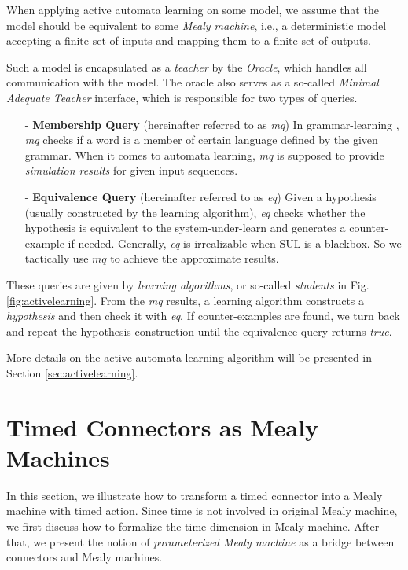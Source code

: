 \documentclass[conference, a4paper]{IEEEtran}
\begin{document}
When applying active automata learning on some model, we assume that the model should be equivalent
to some \emph{Mealy machine}, i.e., a deterministic model accepting a finite set of inputs and
mapping them to a finite set of outputs.

Such a model is encapsulated as a \emph{teacher} by the \emph{Oracle}, which handles
all communication with the model. The oracle also serves as a so-called \emph{Minimal Adequate Teacher}
interface, which is responsible for two types of queries. 

\begin{itemize}
  \item[-] \textbf{Membership Query} (hereinafter referred to as \emph{mq}) In grammar-learning
    \cite{DBLP:journals/iandc/Angluin87}, \emph{mq} checks if a word is a member of certain language
    defined by the given grammar. When it comes to
    automata learning, \emph{mq} is supposed to provide \emph{simulation results} for given input
    sequences.
  \item[-] \textbf{Equivalence Query} (hereinafter referred to as \emph{eq}) Given a hypothesis
    (usually constructed by the learning algorithm), \emph{eq} checks whether the hypothesis is
    equivalent to the system-under-learn and generates a counter-example if needed. Generally, 
    \emph{eq} is irrealizable when SUL is a blackbox. So we tactically use $mq$ to achieve the
    approximate results.
\end{itemize}

These queries are given by \emph{learning algorithms}, or so-called \emph{students} in Fig.
\ref{fig:activelearning}. From the \emph{mq} results, a learning algorithm constructs a
\emph{hypothesis} and then check it with \emph{eq}. If counter-examples are found, we turn back and
repeat the hypothesis construction until the equivalence query returns \emph{true}.

More details on the active automata learning algorithm will be presented in Section
\ref{sec:activelearning}. 


\section{Timed Connectors as Mealy Machines}
\label{sec:semantics}

In this section, we illustrate how to transform a timed connector into a Mealy machine with timed
action.
Since time is not involved in original Mealy machine, we first discuss how to formalize the time
dimension in Mealy machine. After that, we present the notion of \emph{parameterized Mealy
machine} as a bridge between connectors and Mealy machines.
\end{document}
